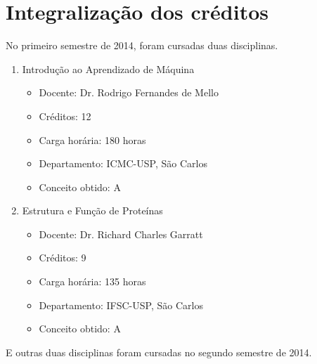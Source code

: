 \chapter{Integralização dos créditos}\label{ch:introducao}

No primeiro semestre de 2014, foram cursadas duas disciplinas.



\begin{enumerate}
	\item Introdução ao Aprendizado de Máquina
	\begin{itemize}
		\item Docente: Dr. Rodrigo Fernandes de Mello
		\item Créditos: 12
		\item Carga horária: 180 horas
		\item Departamento: ICMC-USP, São Carlos
		\item Conceito obtido: A
	\end{itemize}
	\item Estrutura e Função de Proteínas
	\begin{itemize}
		\item Docente: Dr. Richard Charles Garratt
		\item Créditos: 9
		\item Carga horária: 135 horas
		\item Departamento: IFSC-USP, São Carlos
		\item Conceito obtido: A
	\end{itemize}
\end{enumerate}

E outras duas disciplinas foram cursadas no segundo semestre de 2014.

